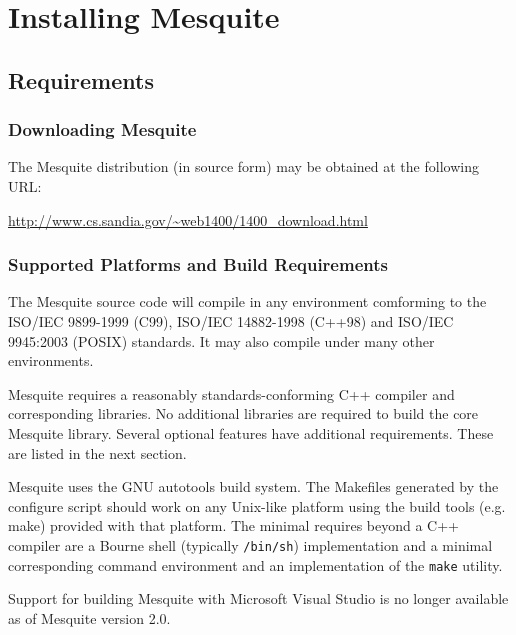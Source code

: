 \chapter{Installing Mesquite} \label{sec:install}

\section{Requirements}

\subsection{Downloading Mesquite}
The Mesquite distribution (in source form) may be obtained at the following URL:
\begin{center}
\url{http://www.cs.sandia.gov/~web1400/1400_download.html}
\end{center}

\subsection{Supported Platforms and Build Requirements}
The Mesquite source code will compile in any environment comforming to the ISO/IEC 9899-1999 (C99), ISO/IEC 14882-1998 (C++98) and ISO/IEC 9945:2003 (POSIX) standards. It may also compile under many other environments.

Mesquite requires a reasonably standards-conforming C++ compiler and corresponding libraries.  No additional libraries are required to build the core Mesquite library. Several optional features have additional requirements.  These are listed in the next section.

Mesquite uses the GNU autotools build system.  The Makefiles generated by the
configure script should work on any Unix-like platform using the build tools
(e.g. make) provided with that platform.  The minimal requires beyond a C++
compiler are a Bourne shell (typically \texttt{/bin/sh}) implementation and
a minimal corresponding command environment and an implementation of the \texttt{make} utility.

Support for building Mesquite with Microsoft Visual Studio is no longer
available as of Mesquite version 2.0.  


